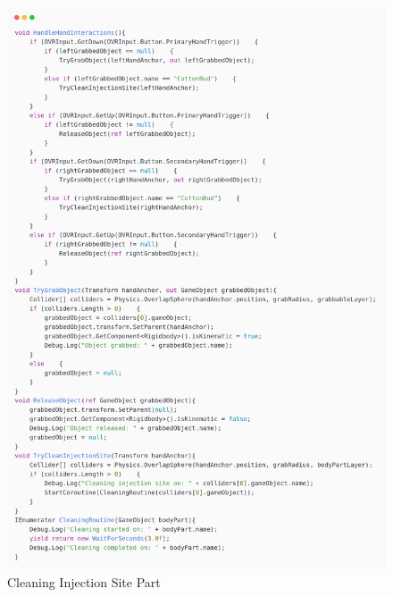 \begin{figure}[h] 
	\centering
	\includegraphics[width=1\textwidth, height=0.7\textheight]{Images/cleaning1.png}
	\caption{Cleaning Injection Site Part}
	\label{fig:Cleaning Injection Site Part}
\end{figure}
\newpage
	\newline
